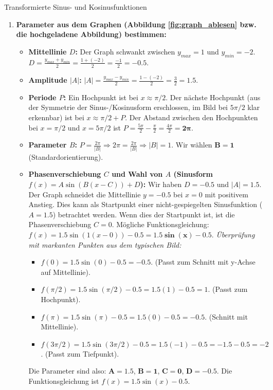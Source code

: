 \begin{loesungsumgebung}{Transformierte Sinus- und Kosinusfunktionen}
\begin{enumerate}[label=(\alph*)]
    \item \textbf{Parameter aus dem Graphen (Abbildung \ref{fig:graph_ablesen} bzw. die hochgeladene Abbildung) bestimmen:}
    \begin{itemize}
        \item \textbf{Mittellinie $D$:} Der Graph schwankt zwischen $y_{max}=1$ und $y_{min}=-2$.
        $D = \frac{y_{max} + y_{min}}{2} = \frac{1 + (-2)}{2} = \frac{-1}{2} = \mathbf{-0.5}$.
        \item \textbf{Amplitude $|A|$:} $|A| = \frac{y_{max} - y_{min}}{2} = \frac{1 - (-2)}{2} = \frac{3}{2} = \mathbf{1.5}$.
        \item \textbf{Periode $P$:} Ein Hochpunkt ist bei $x \approx \pi/2$. Der nächste Hochpunkt (aus der Symmetrie der Sinus-/Kosinusform erschlossen, im Bild bei $5\pi/2$ klar erkennbar) ist bei $x \approx \pi/2 + P$. Der Abstand zwischen den Hochpunkten bei $x=\pi/2$ und $x=5\pi/2$ ist $P = \frac{5\pi}{2} - \frac{\pi}{2} = \frac{4\pi}{2} = \mathbf{2\pi}$.
        \item \textbf{Parameter $B$:} $P = \frac{2\pi}{|B|} \Rightarrow 2\pi = \frac{2\pi}{|B|} \Rightarrow |B|=1$. Wir wählen $\mathbf{B=1}$ (Standardorientierung).
        \item \textbf{Phasenverschiebung $C$ und Wahl von $A$ (Sinusform $f(x) = A \sin(B(x-C)) + D$):}
        Wir haben $D=-0.5$ und $|A|=1.5$.
        Der Graph schneidet die Mittellinie $y=-0.5$ bei $x=0$ mit positivem Anstieg. Dies kann als Startpunkt einer nicht-gespiegelten Sinusfunktion ($A=1.5$) betrachtet werden.
        Wenn dies der Startpunkt ist, ist die Phasenverschiebung $C=0$.
        Mögliche Funktionsgleichung: $f(x) = 1.5 \sin(1(x-0)) - 0.5 = \mathbf{1.5 \sin(x) - 0.5}$.
        \textit{Überprüfung mit markanten Punkten aus dem typischen Bild:}
        \begin{itemize}
            \item $f(0) = 1.5 \sin(0) - 0.5 = -0.5$. (Passt zum Schnitt mit y-Achse auf Mittellinie).
            \item $f(\pi/2) = 1.5 \sin(\pi/2) - 0.5 = 1.5(1) - 0.5 = 1$. (Passt zum Hochpunkt).
            \item $f(\pi) = 1.5 \sin(\pi) - 0.5 = 1.5(0) - 0.5 = -0.5$. (Schnitt mit Mittellinie).
            \item $f(3\pi/2) = 1.5 \sin(3\pi/2) - 0.5 = 1.5(-1) - 0.5 = -1.5 - 0.5 = -2$. (Passt zum Tiefpunkt).
        \end{itemize}
        Die Parameter sind also: $\mathbf{A=1.5}$, $\mathbf{B=1}$, $\mathbf{C=0}$, $\mathbf{D=-0.5}$.
        Die Funktionsgleichung ist $f(x) = 1.5 \sin(x) - 0.5$.
    \end{itemize}
\end{enumerate}

\end{loesungsumgebung}





